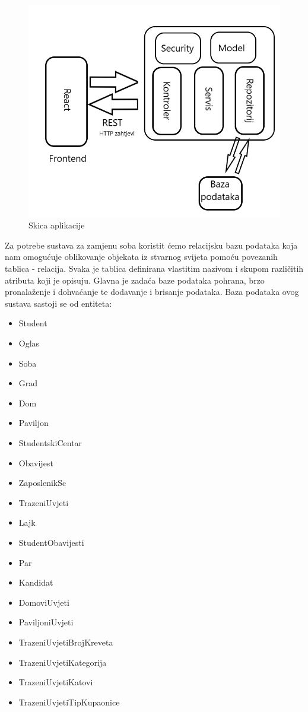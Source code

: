 \begin{figure}[H]
\includegraphics[scale=0.4]{slike/Skica_aplikacije.png} %
\centering
\caption{Skica aplikacije}
\label{fig:aplikacija}
\end{figure}


	
		

		

				
		Za potrebe sustava za zamjenu soba koristit ćemo relacijsku bazu podataka koja nam omogućuje oblikovanje objekata iz stvarnog svijeta pomoću povezanih tablica - relacija. Svaka je tablica definirana vlastitim nazivom i skupom različitih atributa koji je opisuju. Glavna je zadaća baze podataka pohrana, brzo pronalaženje i dohvaćanje te dodavanje i brisanje podataka. Baza podataka ovog sustava sastoji se od entiteta:
	\begin{itemize}
		\item Student
		\item Oglas
		\item Soba
		\item Grad
		\item Dom
		\item Paviljon
		\item StudentskiCentar
		\item Obavijest
		\item ZaposlenikSc
		\item TrazeniUvjeti
		\item Lajk
		\item StudentObavijesti
		\item Par
		\item Kandidat
		\item DomoviUvjeti
		\item PaviljoniUvjeti
		\item TrazeniUvjetiBrojKreveta
		\item TrazeniUvjetiKategorija
		\item TrazeniUvjetiKatovi
		\item TrazeniUvjetiTipKupaonice
		\\
		
	\end{itemize}
	
